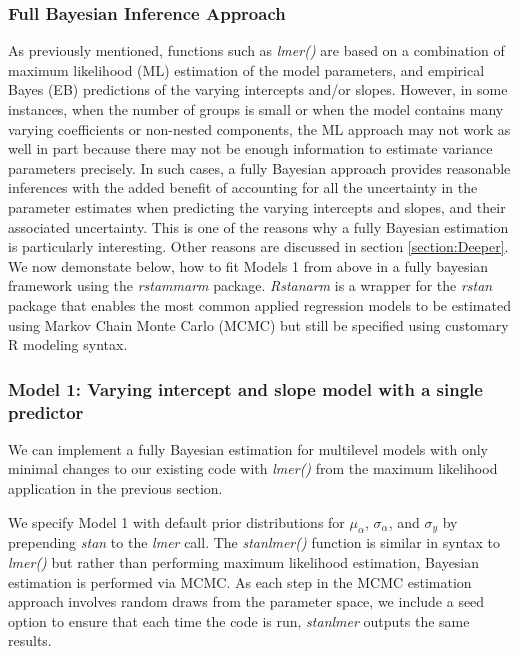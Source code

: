 \subsubsection{Full Bayesian Inference Approach}
As previously mentioned, functions such as \textit{lmer()} are based on a combination of maximum likelihood (ML) estimation of the model parameters, and empirical Bayes (EB) predictions of the varying intercepts and/or slopes. However, in some instances, when the number of groups is small or when the model contains many varying coefficients or non-nested components, the ML approach may not work as well in part because there may not be enough information to estimate variance parameters precisely. In such cases, a fully Bayesian approach provides reasonable inferences with the added benefit of accounting for all the uncertainty in the parameter estimates when predicting the varying intercepts and slopes, and their associated uncertainty. This is one of the reasons why a fully Bayesian estimation is particularly interesting. Other reasons are discussed in section \ref{section:Deeper}. We now demonstate below, how to fit Models 1 from above in a fully bayesian framework using the \textit{rstammarm} package. \textit{Rstanarm} is a wrapper for the \textit{rstan} package that enables the most common applied regression models to be estimated using Markov Chain Monte Carlo (MCMC) but still be specified using customary R modeling syntax.

\subsubsection*{Model 1: Varying intercept and slope model with a single predictor}

We can implement a fully Bayesian estimation for multilevel models with only minimal changes to our existing code with \textit{lmer()} from the maximum likelihood application in the previous section.

We specify Model 1 with default prior distributions for $\mu_{\alpha}$, $\sigma_{\alpha}$, and $\sigma_{y}$ by prepending \textit{stan\textunderscore} to the \textit{lmer} call. The \textit{stan\textunderscore lmer()} function is similar in syntax to \textit{lmer()} but rather than performing maximum likelihood estimation, Bayesian estimation is performed via MCMC. As each step in the MCMC estimation approach involves random draws from the parameter space, we include a seed option to ensure that each time the code is run, \textit{stan\textunderscore lmer} outputs the same results.

